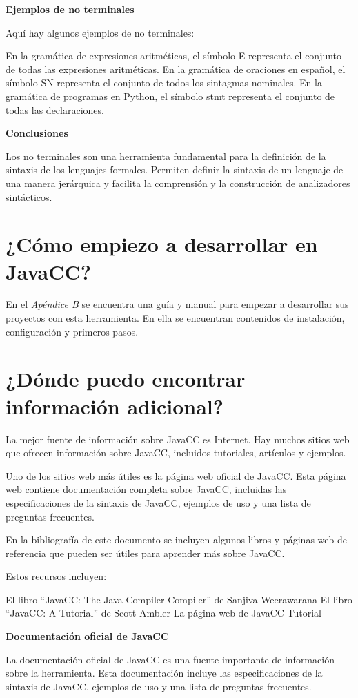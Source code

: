 \textbf{Ejemplos de no terminales}

Aquí hay algunos ejemplos de no terminales:

    En la gramática de expresiones aritméticas, el símbolo E representa el conjunto de todas las expresiones aritméticas.
    En la gramática de oraciones en español, el símbolo SN representa el conjunto de todos los sintagmas nominales.
    En la gramática de programas en Python, el símbolo stmt representa el conjunto de todas las declaraciones.

\textbf{Conclusiones}

Los no terminales son una herramienta fundamental para la definición de la sintaxis de los lenguajes formales. Permiten definir la sintaxis de un lenguaje de una manera jerárquica y facilita la comprensión y la construcción de analizadores sintácticos.

\section{¿Cómo empiezo a desarrollar en JavaCC?}

En el \hyperref[sec:instalaciondejavacc]{\textit{Apéndice B}} se encuentra una guía y manual para empezar a desarrollar sus proyectos con esta herramienta. En ella se encuentran contenidos de instalación, configuración y primeros pasos.


\section{¿Dónde puedo encontrar información adicional?}

La mejor fuente de información sobre JavaCC es Internet. Hay muchos sitios web que ofrecen información sobre JavaCC, incluidos tutoriales, artículos y ejemplos.

Uno de los sitios web más útiles es la página web oficial de JavaCC. Esta página web contiene documentación completa sobre JavaCC, incluidas las especificaciones de la sintaxis de JavaCC, ejemplos de uso y una lista de preguntas frecuentes.

En la bibliografía de este documento se incluyen algunos libros y páginas web de referencia que pueden ser útiles para aprender más sobre JavaCC.

Estos recursos incluyen:

    El libro ``JavaCC: The Java Compiler Compiler'' de Sanjiva Weerawarana
    El libro ``JavaCC: A Tutorial'' de Scott Ambler
    La página web de JavaCC Tutorial

\textbf{Documentación oficial de JavaCC}

La documentación oficial de JavaCC es una fuente importante de información sobre la herramienta. Esta documentación incluye las especificaciones de la sintaxis de JavaCC, ejemplos de uso y una lista de preguntas frecuentes.
